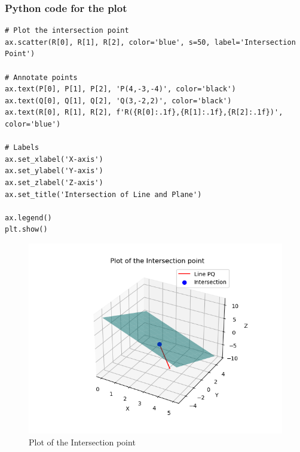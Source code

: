 \documentclass{beamer}
\begin{document}
\begin{frame}[fragile]
  \frametitle{Python code for the plot}
    \begin{lstlisting}
# Plot the intersection point
ax.scatter(R[0], R[1], R[2], color='blue', s=50, label='Intersection Point')

# Annotate points
ax.text(P[0], P[1], P[2], 'P(4,-3,-4)', color='black')
ax.text(Q[0], Q[1], Q[2], 'Q(3,-2,2)', color='black')
ax.text(R[0], R[1], R[2], f'R({R[0]:.1f},{R[1]:.1f},{R[2]:.1f})', color='blue')

# Labels
ax.set_xlabel('X-axis')
ax.set_ylabel('Y-axis')
ax.set_zlabel('Z-axis')
ax.set_title('Intersection of Line and Plane')

ax.legend()
plt.show()
    \end{lstlisting}
\end{frame}
 \begin{figure}
     \centering
     \includegraphics[width=0.7\linewidth]{figs/fig1.png}
     \caption{Plot of the Intersection point }
     \label{fig1}
 \end{figure}
\end{document}
